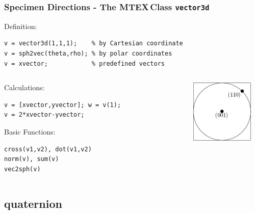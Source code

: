 \documentclass{beamer}
\newcommand{\MTEX}{{\bf {\color{red}M}TEX\,}}%
\begin{document}
\begin{frame}[fragile]
  \frametitle{Specimen Directions - The \MTEX Class \texttt{\bf vector3d}}

  Definition: 

\begin{lstlisting}
v = vector3d(1,1,1);    % by Cartesian coordinate
v = sph2vec(theta,rho); % by polar coordinates
v = xvector;            % predefined vectors
\end{lstlisting}
  
  \medskip

  \begin{columns}
    \begin{column}{8.5cm}

      Calculations:
      
\begin{lstlisting}
v = [xvector,yvector]; w = v(1);              
v = 2*xvector-yvector; 
\end{lstlisting}
      
    \medskip
    
    Basic Functions:
    
\begin{lstlisting}
cross(v1,v2), dot(v1,v2)
norm(v), sum(v)
vec2sph(v)
\end{lstlisting}
  \end{column}
  \begin{column}{3cm}
   \includegraphics[width=3cm]{pic/vector3d}
  \end{column}
\end{columns}



\end{frame}

\subsection*{quaternion}
\end{document}
